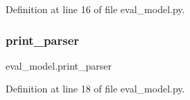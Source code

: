 Definition at line 16 of file eval\+\_\+model.\+py.

\mbox{\label{namespaceeval__model_a09dddb88f4842a88e26a0961b1c8a5e3}} 
\subsubsection{\texorpdfstring{print\+\_\+parser}{print\_parser}}
{\footnotesize\ttfamily eval\+\_\+model.\+print\+\_\+parser}



Definition at line 18 of file eval\+\_\+model.\+py.

